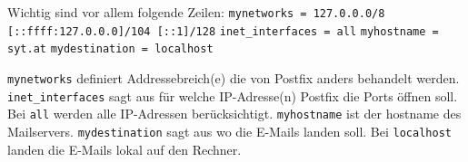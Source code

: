 Wichtig sind vor allem folgende Zeilen:
\verb|mynetworks = 127.0.0.0/8 [::ffff:127.0.0.0]/104 [::1]/128|\newline
\verb|inet_interfaces = all|\newline
\verb|myhostname = syt.at|\newline
\verb|mydestination = localhost|\newline

\verb|mynetworks| definiert Addressebreich(e) die von Postfix anders behandelt werden.\newline
\verb|inet_interfaces| sagt aus für welche IP-Adresse(n) Postfix die Ports öffnen soll. Bei \verb|all| werden alle IP-Adressen berücksichtigt.\newline
\verb|myhostname| ist der hostname des Mailservers.\newline
\verb|mydestination| sagt aus wo die E-Mails landen soll. Bei \verb|localhost| landen die E-Mails lokal auf den Rechner.\newline



